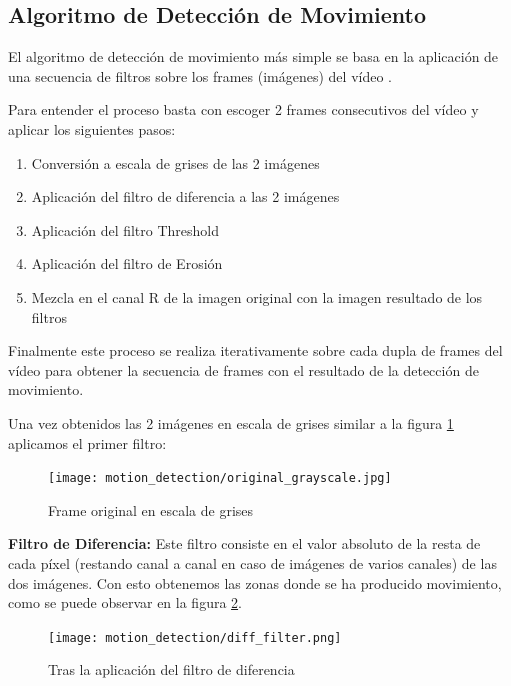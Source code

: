\documentclass[twoside]{article}
\begin{document}
\subsection{Algoritmo de Detección de Movimiento}

El algoritmo de detección de movimiento más simple se basa en la aplicación de una secuencia de filtros sobre los frames (imágenes) del vídeo \cite{codeproject}.

Para entender el proceso basta con escoger 2 frames consecutivos del vídeo y aplicar los siguientes pasos:

\begin{enumerate}
   \item Conversión a escala de grises de las 2 imágenes
   \item Aplicación del filtro de diferencia a las 2 imágenes
   \item Aplicación del filtro Threshold
   \item Aplicación del filtro de Erosión
   \item Mezcla en el canal R de la imagen original con la imagen resultado de los filtros
\end{enumerate}

Finalmente este proceso se realiza iterativamente sobre cada dupla de frames del vídeo para obtener la secuencia de frames con el resultado de la detección de movimiento. 

Una vez obtenidos las 2 imágenes en escala de grises similar a la figura \ref{fig:original_grayscale} aplicamos el primer filtro:

\begin{figure}
   \begin{center}
      \texttt{[image: motion\_detection/original\_grayscale.jpg]}
      \caption{\label{fig:original_grayscale}Frame original en escala de grises}
   \end{center}
\end{figure}

\textbf{Filtro de Diferencia:} Este filtro consiste en el valor absoluto de la resta de cada píxel (restando canal a canal en caso de imágenes de varios canales) de las dos imágenes. Con esto obtenemos las zonas donde se ha producido movimiento, como se puede observar en la figura \ref{fig:diff_filter}.

\begin{figure}
   \begin{center}
      \texttt{[image: motion\_detection/diff\_filter.png]}
      \caption{\label{fig:diff_filter}Tras la aplicación del filtro de diferencia}
   \end{center}
\end{figure}
\end{document}
